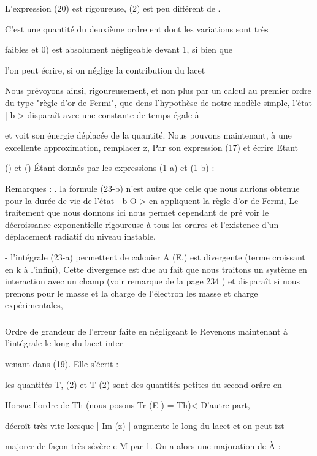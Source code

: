 L'expression (20) est rigoureuse, (2) est peu différent de .

C'est une quantité du deuxième ordre ent dont les variations sont très

faibles et 0) est absolument négligeable devant 1, si bien que

l'on peut écrire, si on néglige la contribution du lacet

Nous prévoyons ainsi, rigoureusement, et non plus par un calcul
au premier ordre du type "règle d'or de Fermi", que dens l'hypothèse de notre
modèle simple, l'état | b  > disparaît avec une constante de temps égale à

 et voit son énergie déplacée de la quantité.
Nous pouvons maintenant, à une excellente approximation, remplacer
z, Par son expression (17) et écrire
Etant


() et () Étant donnés par les expressions (1-a) et (1-b) :

Remarques : . la formule (23-b) n'est autre que celle que nous aurions
obtenue pour la durée de vie de l'état | b O > en appliquent la règle d'or
de Fermi, Le traitement que nous donnons ici nous permet cependant de pré
voir le décroissance exponentielle rigoureuse à tous les ordres et l'existence d'un déplacement radiatif du niveau instable,

- l'intégrale (23-a) permettent de calcuier A (E,) est divergente (terme croissant en k à l'infini), Cette divergence est due au fait
que nous traitons un système en interaction avec un champ (voir remarque de
la page 234 ) et disparaît si nous prenons pour le masse et la charge de
l'électron les masse et charge expérimentales,

\subsubsection{} Ordre de grandeur de l'erreur faite en négligeant le%
Revenons maintenant à l'intégrale le long du lacet inter

venant dans (19). Elle s'écrit :


les quantités T, (2) et T (2) sont des quantités petites du second orâre en

Horsae l'ordre de Th (nous posons Tr (E ) = Th)< D'autre part,

décroît très vite lorsque | Im (z) | augmente le long du lacet et on peut
izt

majorer de façon très sévère e M par 1. On a alors une majoration de À :

